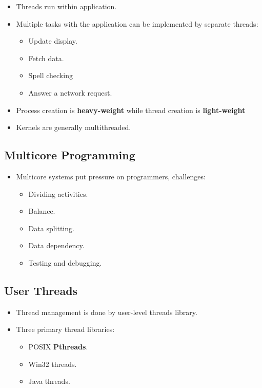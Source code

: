 \documentclass[10pt]{article}
\newcommand{\tf}{\textbf}
\begin{document}
\begin{itemize}
	\item Threads run within application.
	\item Multiple tasks with the application can be implemented by separate threads: 
	\begin{itemize}
		\item Update display.
		\item Fetch data.
		\item Spell checking
		\item Answer a network request.
	\end{itemize}

	\item Process creation is \tf{heavy-weight} while thread creation is \tf{light-weight}
	\item Kernels are generally multithreaded.
\end{itemize}

\subsection{Multicore Programming}

\begin{itemize}
	\item Multicore systems put pressure on programmers, challenges:
	\begin{itemize}
		\item Dividing activities.
		\item Balance.
		\item Data splitting.
		\item Data dependency.
		\item Testing and debugging.
	\end{itemize}
\end{itemize}

\subsection{User Threads}

\begin{itemize}
	\item Thread management is done by user-level threads library.
	\item Three primary thread libraries:
	\begin{itemize}
		\item POSIX \tf{Pthreads}.
		\item Win32 threads.
		\item Java threads.
	\end{itemize}
\end{itemize}
\end{document}
